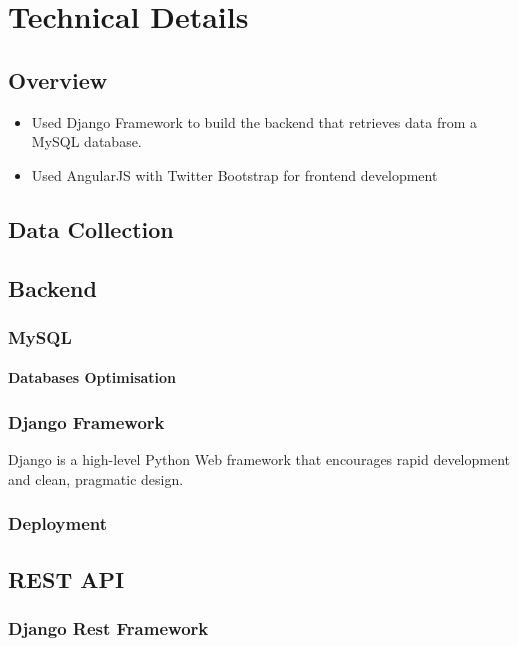 \chapter{Technical Details}

\section{Overview}
\begin{itemize}
\item Used Django Framework to build the backend that retrieves data from a MySQL database.

\item Used AngularJS with Twitter Bootstrap for frontend development
\end{itemize}

\section{Data Collection}

\section{Backend}
\subsection{MySQL}
\subsubsection{Databases Optimisation}
\subsection{Django Framework}
\par Django is a high-level Python Web framework that encourages rapid development and clean, pragmatic design\cite{django_framework}.
\subsection{Deployment}

\section{REST API}
\subsection{Django Rest Framework}

